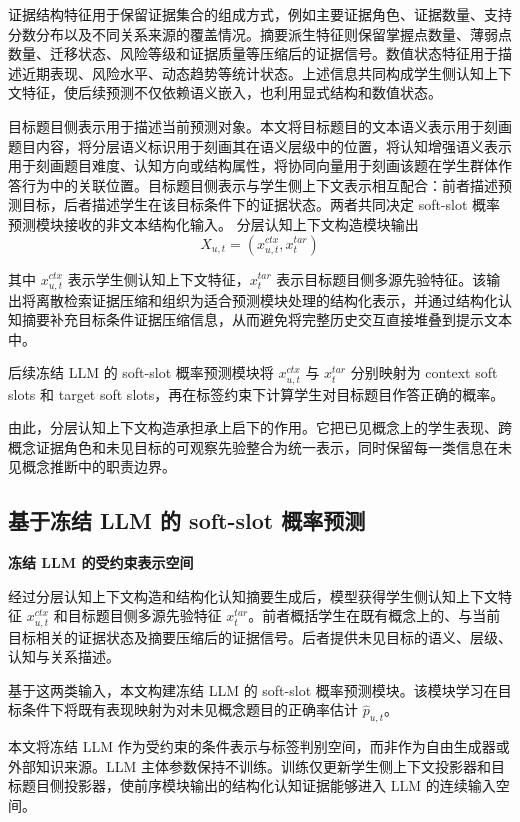 \documentclass[UTF8,a4paper,12pt]{ctexart}
\numberwithin{table}{section}
\begin{document}
证据结构特征用于保留证据集合的组成方式，例如主要证据角色、证据数量、支持分数分布以及不同关系来源的覆盖情况。摘要派生特征则保留掌握点数量、薄弱点数量、迁移状态、风险等级和证据质量等压缩后的证据信号。数值状态特征用于描述近期表现、风险水平、动态趋势等统计状态。上述信息共同构成学生侧认知上下文特征，使后续预测不仅依赖语义嵌入，也利用显式结构和数值状态。

目标题目侧表示用于描述当前预测对象。本文将目标题目的文本语义表示用于刻画题目内容，将分层语义标识用于刻画其在语义层级中的位置，将认知增强语义表示用于刻画题目难度、认知方向或结构属性，将协同向量用于刻画该题在学生群体作答行为中的关联位置。目标题目侧表示与学生侧上下文表示相互配合：前者描述预测目标，后者描述学生在该目标条件下的证据状态。两者共同决定 soft-slot 概率预测模块接收的非文本结构化输入。
分层认知上下文构造模块输出
\[
X_{u,t}=(x^{ctx}_{u,t},x^{tar}_{t})
\]

其中 \(x^{ctx}_{u,t}\) 表示学生侧认知上下文特征，\(x^{tar}_{t}\) 表示目标题目侧多源先验特征。该输出将离散检索证据压缩和组织为适合预测模块处理的结构化表示，并通过结构化认知摘要补充目标条件证据压缩信息，从而避免将完整历史交互直接堆叠到提示文本中。



后续冻结 LLM 的 soft-slot 概率预测模块将 \(x^{ctx}_{u,t}\) 与 \(x^{tar}_{t}\) 分别映射为 context soft slots 和 target soft slots，再在标签约束下计算学生对目标题目作答正确的概率。

由此，分层认知上下文构造承担承上启下的作用。它把已见概念上的学生表现、跨概念证据角色和未见目标的可观察先验整合为统一表示，同时保留每一类信息在未见概念推断中的职责边界。

\subsection{基于冻结 LLM 的 soft-slot 概率预测}

\noindent\textbf{冻结 LLM 的受约束表示空间}



经过分层认知上下文构造和结构化认知摘要生成后，模型获得学生侧认知上下文特征 \(x^{ctx}_{u,t}\) 和目标题目侧多源先验特征 \(x^{tar}_{t}\)。前者概括学生在既有概念上的、与当前目标相关的证据状态及摘要压缩后的证据信号。后者提供未见目标的语义、层级、认知与关系描述。

基于这两类输入，本文构建冻结 LLM 的 soft-slot 概率预测模块。该模块学习在目标条件下将既有表现映射为对未见概念题目的正确率估计 \(\hat{p}_{u,t}\)。



本文将冻结 LLM 作为受约束的条件表示与标签判别空间，而非作为自由生成器或外部知识来源。LLM 主体参数保持不训练。训练仅更新学生侧上下文投影器和目标题目侧投影器，使前序模块输出的结构化认知证据能够进入 LLM 的连续输入空间。
\end{document}

